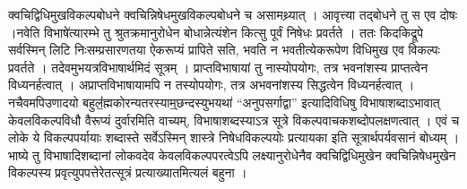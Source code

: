 क्वचिद्विधिमुखविकल्पबोधने क्वचिन्निषेधमुखविकल्पबोधने च असामथ्र्यात् ।
आवृत्त्या तद्बोधने तु स एव दोषः ।नवेति विभाषे॑त्यारम्भे तु
श्रुतक्रमानुरोधेन बोधान्नेत्यंशेन कित्सु पूर्वं निषेधः प्रवर्तते । ततः
किदकिद्रूपे सर्वस्मिन् लिटि निःसम्प्रसारणतया ऐकरूप्यं प्रापिते सति, भवति
न भवतीत्येकरूपेण विधिमुख एव विकल्पः प्रवर्तते । तदेवमुभयत्रविभाषार्थमिदं
सूत्रम् । प्राप्तविभाषायां तु नास्योपयोगः, तत्र भवनांशस्य प्राप्तत्वेन
विध्यनर्हत्वात् । अप्राप्तविभाषायामपि न तस्योपयोगः, तत्र अभवनांशस्य
सिद्धत्वेन विध्यनर्हत्वात् । नचैवमपिउणादयो
बहुलं॒॑ह्मकोरन्यतरस्याम्॒छन्दस्युभयथा॑ ``अनुपसर्गाद्वा'' इत्यादिविधिषु
विभाषाशब्दाऽभावात् केवलविकल्पविधौ वैरूप्यं दुर्वारमिति वाच्यम्,
विभाषाशब्दस्याऽत्र सूत्रे विकल्पवाचकशब्दोपलक्षणत्वात् । एवं च लोके ये
विकल्पपर्यायाः शब्दास्ते सर्वेऽस्मिन् शास्त्रे निषेधविकल्पयोः प्रत्यायका
इति सूत्रार्थपर्यवसानं बोध्यम् । भाष्ये तु विभाषादिशब्दानां लोकवदेव
केवलविकल्पपरत्वेऽपि लक्ष्यानुरोधेनैव क्वचिद्विधिमुखेन क्वचिन्निषेधमुखेन
विकल्पस्य प्रवृत्युपपत्तेरेतत्सूत्रं प्रत्याख्यातमित्यलं बहुना ।
